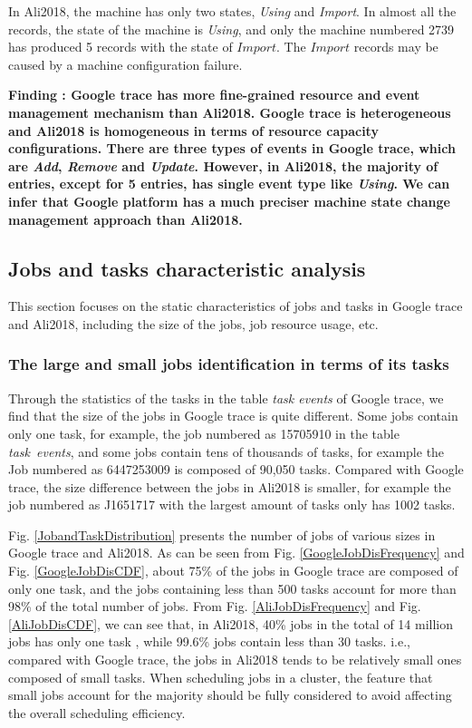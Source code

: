 \documentclass[conference]{IEEEtran}
\begin{document}
In Ali2018, the machine has only two states, \emph{Using} and \emph{Import}. In almost all the records, the state of the machine is \emph{Using}, and only the machine numbered 2739 has produced 5 records with the state of $Import$. The $Import$ records may be caused by a machine configuration failure.

{\bfseries Finding \theFindingcounter: Google trace has  more fine-grained resource  and event management mechanism than Ali2018.
Google trace is heterogeneous and Ali2018 is homogeneous in terms of resource capacity configurations. There are three types of events in Google trace, which are \emph{Add}, \emph{Remove} and \emph{Update}. However, in Ali2018, the majority of entries, except for 5 entries, has single event type like \emph{Using}. We can infer that Google platform has a much preciser machine state change management approach than Ali2018.}

\subsection{Jobs and tasks characteristic analysis}
 This section focuses on the static characteristics of jobs and tasks in Google trace and Ali2018, including the size of the jobs, job resource usage, etc.

\subsubsection{The large and small jobs identification in terms of its tasks}
Through the statistics of the tasks in the table \emph{task events}  of Google trace, we find that the size of the jobs in Google trace is quite different. Some jobs contain only one task, for example, the job numbered as 15705910 in the table \emph{task\ events}, and some jobs contain tens of thousands of tasks, for example the Job numbered as 6447253009 is composed of 90,050 tasks. Compared with Google trace, the size difference between the jobs in Ali2018 is smaller, for example the job numbered as J1651717 with the largest amount of tasks only has 1002 tasks.


Fig. \ref{JobandTaskDistribution} presents the number of jobs of various sizes in Google trace and Ali2018. As can be seen from  Fig. \ref{GoogleJobDisFrequency} and Fig. \ref{GoogleJobDisCDF}, about 75\% of the jobs in Google trace are composed of only one task, and the jobs containing less than 500 tasks account for more than 98\% of the total number of jobs. From Fig. \ref{AliJobDisFrequency} and Fig. \ref{AliJobDisCDF}, we can see that, in Ali2018,  40\% jobs in the total of 14 million jobs has only one task , while  99.6\% jobs contain less than 30 tasks. i.e., compared with Google trace, the jobs in Ali2018 tends to be relatively small ones composed of small tasks. When scheduling jobs in a cluster, the feature that small jobs account for the majority should be fully considered to avoid affecting the overall scheduling efficiency.
\end{document}
